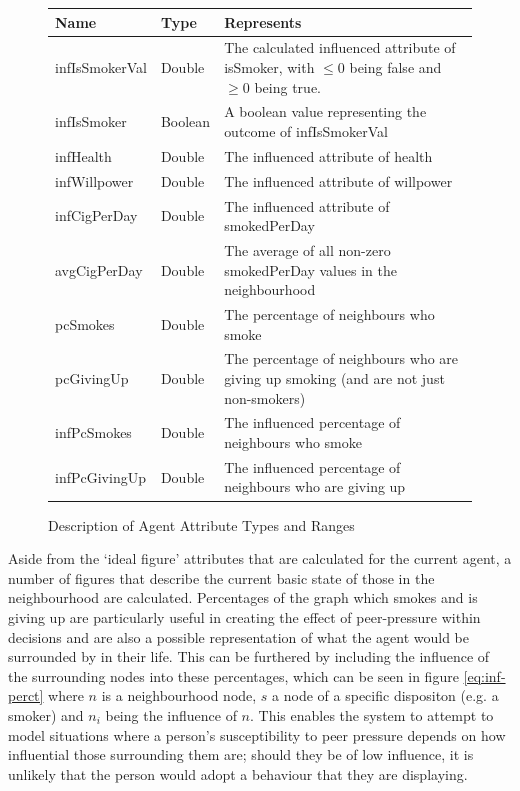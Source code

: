 \documentclass[]{report}
\begin{document}
\begin{figure}
\begin{center}
\label{tab:neighbour}
\begin{tabular}{|l||l|p{10cm}|}
\hline
\bf{Name} & \bf{Type} & \bf{Represents}\\
\hline
infIsSmokerVal 	& Double 	&	The calculated influenced attribute of isSmoker, with $\leq 0$ being false and $\geq 0$ being true.									\\
infIsSmoker			&	Boolean	&	A boolean value representing the outcome of infIsSmokerVal							\\
infHealth				&	Double	&	The influenced attribute of health \\
infWillpower		&	Double	&	The influenced attribute of willpower										\\
infCigPerDay		&	Double	&	The influenced attribute of smokedPerDay						\\
avgCigPerDay		&	Double	&	The average of all non-zero smokedPerDay values in the neighbourhood				\\
pcSmokes				&	Double	&	The percentage of neighbours who smoke\\
pcGivingUp			&	Double	&	The percentage of neighbours who are giving up smoking (and are not just non-smokers)\\
infPcSmokes			&	Double	&	The influenced percentage of neighbours who smoke								\\
infPcGivingUp		&	Double	&	The influenced percentage of neighbours who are giving up							\\
\hline

\end{tabular}
\end{center}
\caption{Description of Agent Attribute Types and Ranges}
\end{figure}

Aside from the `ideal figure' attributes that are calculated for the current agent, a number of figures that describe the current basic state of those in the neighbourhood are calculated. Percentages of the graph which smokes and is giving up are particularly useful in creating the effect of peer-pressure within decisions and are also a possible representation of what the agent would be surrounded by in their life. This can be furthered by including the influence of the surrounding nodes into these percentages, which can be seen in figure \ref{eq:inf-perct} where $n$ is a neighbourhood node, $s$ a node of a specific dispositon (e.g. a smoker) and $n_{i}$ being the influence of $n$. This enables the system to attempt to model situations where a person's susceptibility to peer pressure depends on how influential those surrounding them are; should they be of low influence, it is unlikely that the person would adopt a behaviour that they are displaying.
\end{document}
